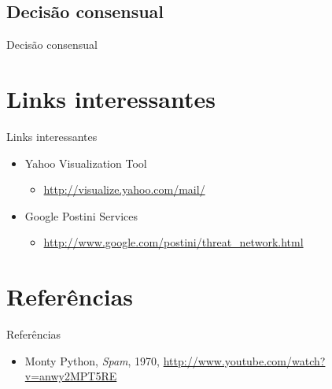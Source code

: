 \documentclass[dvipdfm]{beamer}
\begin{document}
\subsection{Decisão consensual}
\begin{frame}{Decisão consensual}
\end{frame}


\section{Links interessantes}
\begin{frame}{Links interessantes}

	\begin{itemize}
		\item Yahoo Visualization Tool
		\begin{itemize}
			\item \url{http://visualize.yahoo.com/mail/}
		\end{itemize}
		\item Google Postini Services
		\begin{itemize}
			\item \url{http://www.google.com/postini/threat_network.html}
		\end{itemize}
	\end{itemize}

\end{frame}

\section{Referências}
\begin{frame}{Referências}
	\begin{itemize}
		\item Monty Python, \emph{Spam}, 1970, \url{http://www.youtube.com/watch?v=anwy2MPT5RE}
	\end{itemize}
\end{frame}
\end{document}
